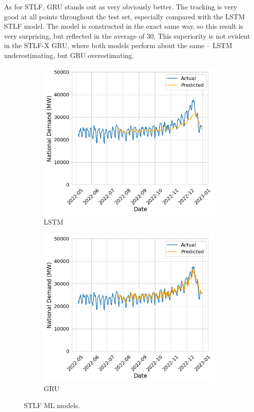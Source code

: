 \documentclass[12pt]{scrreprt}
\begin{document}
As for STLF, GRU stands out as very obviously better. The tracking is very good at all points throughout the test set, especially compared with the LSTM STLF model. The model is constructed in the exact same way, so this result is very surprising, but reflected in the average of 30. This superiority is not evident in the STLF-X GRU, where both models perform about the same -- LSTM underestimating, but GRU overestimating.

\begin{figure}[t!]
    \centering
    \begin{subfigure}{.5\textwidth}
        \centering
        \includegraphics[width=\linewidth]{Images/stoc_plot.png}
        \caption{LSTM}
        \label{fig:stoc_plot}
    \end{subfigure}%
    \begin{subfigure}{.5\textwidth}
        \centering
        \includegraphics[width=\linewidth]{Images/gstoc_plot.png}
        \caption{GRU}
        \label{fig:gstoc_plot}
    \end{subfigure}
    \caption{STLF ML models.}
    \label{fig:stlf_ml}
\end{figure}
\end{document}
